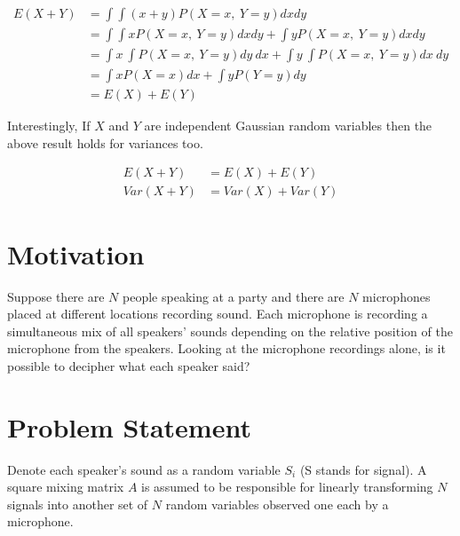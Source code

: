 \documentclass[11pt, a4paper]{article}
\begin{document}
\begin{align*}
	E(X+Y) & = \int \int (x+y)P(X=x,\ Y=y)dxdy                                     \\
	       & = \int \int xP(X=x,\ Y=y)dxdy + \int yP(X=x,\ Y=y)dxdy                \\
	       & = \int x\ \int P(X=x,\ Y=y) dy\ dx + \int y\ \int P(X=x,\ Y=y) dx\ dy \\
	       & = \int xP(X=x)dx + \int yP(Y=y)dy                                     \\
	       & = E(X) + E(Y)                                                         
\end{align*}

Interestingly, If $X$ and $Y$ are independent Gaussian random variables then the above result holds for variances too.

\begin{align*}
	E(X+Y)   & = E(X) + E(Y)     \\
	Var(X+Y) & = Var(X) + Var(Y) 
\end{align*}

\section{Motivation}

Suppose there are $N$ people speaking at a party and there are $N$ microphones placed at different locations recording sound. Each microphone is recording a simultaneous mix of all speakers' sounds depending on the relative position of the microphone from the speakers. Looking at the microphone recordings alone, is it possible to decipher what each speaker said? 

\section{Problem Statement}

Denote each speaker's sound as a random variable $S_i$ (S stands for signal). A square mixing matrix $A$ is assumed to be responsible for linearly transforming $N$ signals into another set of $N$ random variables observed one each by a microphone.  
\end{document}
